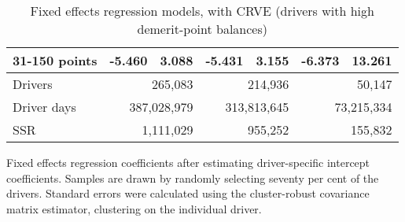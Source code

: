 \begin{table}
\begin{tabular}{l r r r r r r}
31-150 points  & -5.460  &  3.088  & -5.431  &  3.155  & -6.373  & 13.261   \\ 
 

\hline 
 

Drivers 
 & \multicolumn{2}{r}{265,083}  & \multicolumn{2}{r}{214,936}  & \multicolumn{2}{r}{50,147}   \\ 
 

Driver days 
 & \multicolumn{2}{r}{387,028,979}  & \multicolumn{2}{r}{313,813,645}  & \multicolumn{2}{r}{73,215,334}   \\ 
 

SSR 
 & \multicolumn{2}{r}{1,111,029}  & \multicolumn{2}{r}{955,252}  & \multicolumn{2}{r}{155,832}   \\ 
 

\hline 
 
\end{tabular} 
\caption{Fixed effects regression models, with CRVE (drivers with high demerit-point balances)} 
Fixed effects regression coefficients after estimating driver-specific intercept coefficients. 
Samples are drawn by randomly selecting seventy per cent of the drivers. 
Standard errors were calculated using the cluster-robust covariance matrix estimator, 
clustering on the individual driver. 
\label{tab:FE_regs_CRVE_high_pts} 
\end{table} 
 
